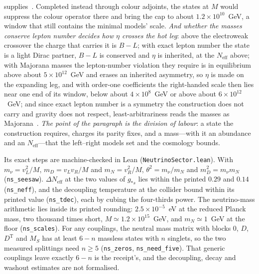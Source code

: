 \documentclass[11pt,a4paper]{article}
\theoremstyle{plain}
\theoremstyle{definition}
\theoremstyle{remark}
\begin{document}
supplies~\cite{JanzenMatter}. Completed instead through colour adjoints, the states at $M$ would suppress the colour operator there and bring the cap to about $1.2\times10^{10}$~GeV, a window that still contains the minimal models' scale. \emph{And whether the masses conserve lepton number decides how $\eta$ crosses the hot leg}: above the electroweak crossover the charge that carries it is $B-L$; with exact lepton number the state is a light Dirac partner, $B-L$ is conserved and $\eta$ is inherited, at the $N_{\mathrm{eff}}$ above; with Majorana masses the lepton-number violation they require is in equilibrium above about $5\times10^{12}$~GeV and erases an inherited asymmetry, so $\eta$ is made on the expanding leg, and with order-one coefficients the right-handed scale then lies near one end of its window, below about $4\times10^{8}$~GeV or above about $6\times10^{12}$~GeV; and since exact lepton number is a symmetry the construction does not carry and gravity does not respect, least-arbitrariness reads the masses as Majorana~\cite{JanzenCosmogenesis}. \emph{The point of the paragraph is the division of labour}: a state the construction requires, charges its parity fixes, and a mass---with it an abundance and an $N_{\mathrm{eff}}$---that the left--right models set and the cosmology bounds.

Its exact steps are machine-checked in Lean (\texttt{NeutrinoSector.lean}). With $m_\nu=v_L^{2}/M$, $m_D=v_Lv_R/M$ and $m_N=v_R^{2}/M$, $\theta^{2}=m_\nu/m_N$ and $m_D^{2}=m_\nu m_N$ (\texttt{ns\_seesaw}). $\Delta N_{\mathrm{eff}}$ at the two values of $g_{*s}$ lies within the printed $0.29$ and $0.14$ (\texttt{ns\_neff}), and the decoupling temperature at the collider bound within its printed value (\texttt{ns\_tdec}), each by cubing the four-thirds power. The neutrino-mass arithmetic lies inside its printed rounding: $2.5\times10^{-5}$~eV at the reduced Planck mass, two thousand times short, $M\simeq1.2\times10^{15}$~GeV, and $m_N\simeq1$~GeV at the floor (\texttt{ns\_scales}). For any couplings, the neutral mass matrix with blocks $0$, $D$, $D^{\mathrm{T}}$ and $M_S$ has at least $6-n$ massless states with $n$ singlets, so the two measured splittings need $n\ge5$ (\texttt{ns\_zeros}, \texttt{ns\_need\_five}). That generic couplings leave exactly $6-n$ is the receipt's, and the decoupling, decay and washout estimates are not formalised.
\end{document}

